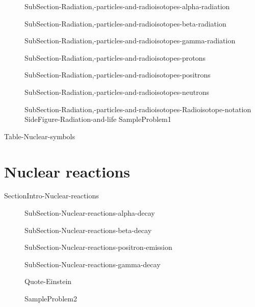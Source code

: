 \documentclass[main.tex]{subfiles}
\begin{document}
\sloppy \begin{description}

\item[] 
{SubSection-Radiation,-particles-and-radioisotopes-alpha-radiation}
\item[] 
  {SubSection-Radiation,-particles-and-radioisotopes-beta-radiation}
\item[] 
{SubSection-Radiation,-particles-and-radioisotopes-gamma-radiation}
\item[] 
{SubSection-Radiation,-particles-and-radioisotopes-protons}
\item[] 
 {SubSection-Radiation,-particles-and-radioisotopes-positrons}
\item[] 
{SubSection-Radiation,-particles-and-radioisotopes-neutrons}
\item[] 
 {SubSection-Radiation,-particles-and-radioisotopes-Radioisotope-notation}
{SideFigure-Radiation-and-life}
  {SampleProblem1}


\end{description}


 
 
 
{Table-Nuclear-symbols}

 
 
 
 
 

\section{Nuclear reactions}
{SectionIntro-Nuclear-reactions}



\sloppy \begin{description}

 


 
 
 
 
\item[] 
{SubSection-Nuclear-reactions-alpha-decay}


\item[] 
{SubSection-Nuclear-reactions-beta-decay}


\item[] 
{SubSection-Nuclear-reactions-positron-emission}


\item[] 
{SubSection-Nuclear-reactions-gamma-decay}

 
  {Quote-Einstein}


  {SampleProblem2}


\end{description}
\end{document}
